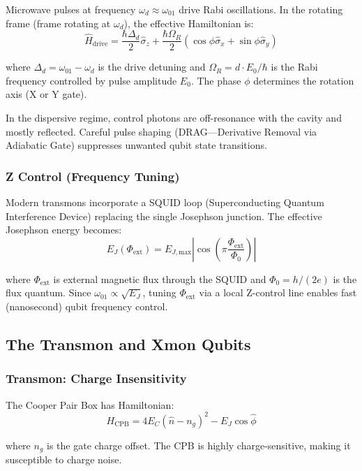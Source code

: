 \documentclass{article}
\begin{document}
Microwave pulses at frequency $\omega_d \approx \omega_{01}$ drive Rabi oscillations. In the rotating frame (frame rotating at $\omega_d$), the effective Hamiltonian is:
$$\hat{H}_{\text{drive}} = \frac{\hbar\Delta_d}{2}\hat{\sigma}_z + \frac{\hbar\Omega_R}{2}(\cos\phi \hat{\sigma}_x + \sin\phi \hat{\sigma}_y)$$

where $\Delta_d = \omega_{01} - \omega_d$ is the drive detuning and $\Omega_R = d \cdot E_0 / \hbar$ is the Rabi frequency controlled by pulse amplitude $E_0$. The phase $\phi$ determines the rotation axis (X or Y gate).

In the dispersive regime, control photons are off-resonance with the cavity and mostly reflected. Careful pulse shaping (DRAG—Derivative Removal via Adiabatic Gate) suppresses unwanted qubit state transitions.

\subsubsection*{Z Control (Frequency Tuning)}

Modern transmons incorporate a SQUID loop (Superconducting Quantum Interference Device) replacing the single Josephson junction. The effective Josephson energy becomes:
$$E_J(\Phi_{\text{ext}}) = E_{J,\text{max}} \left|\cos\left(\pi \frac{\Phi_{\text{ext}}}{\Phi_0}\right)\right|$$

where $\Phi_{\text{ext}}$ is external magnetic flux through the SQUID and $\Phi_0 = h/(2e)$ is the flux quantum. Since $\omega_{01} \propto \sqrt{E_J}$, tuning $\Phi_{\text{ext}}$ via a local Z-control line enables fast (nanosecond) qubit frequency control.

\subsection{The Transmon and Xmon Qubits}

\subsubsection*{Transmon: Charge Insensitivity}

The Cooper Pair Box has Hamiltonian:
$$H_{\text{CPB}} = 4E_C(\hat{n} - n_g)^2 - E_J \cos\hat{\phi}$$

where $n_g$ is the gate charge offset. The CPB is highly charge-sensitive, making it susceptible to charge noise.
\end{document}
